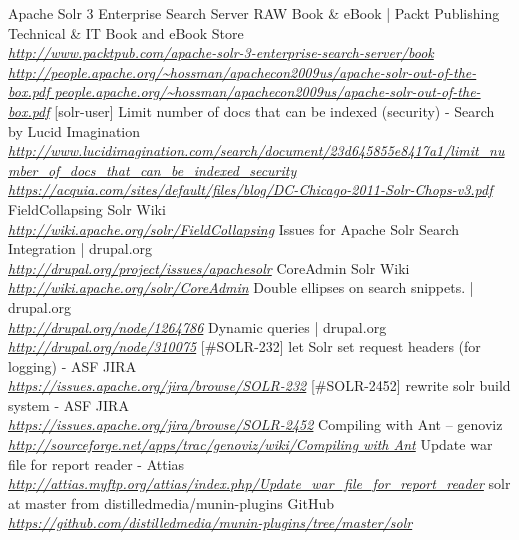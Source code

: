 \begin{thebibliography}{99}
		Apache Solr 3 Enterprise Search Server RAW Book \& eBook | Packt Publishing Technical \& IT Book and eBook Store\\
		\emph{\url{http://www.packtpub.com/apache-solr-3-enterprise-search-server/book}}
		\emph{\url{http://people.apache.org/~hossman/apachecon2009us/apache-solr-out-of-the-box.pdf people.apache.org/~hossman/apachecon2009us/apache-solr-out-of-the-box.pdf}}
		[solr-user] Limit number of docs that can be indexed (security) - Search by Lucid Imagination\\
		\emph{\url{http://www.lucidimagination.com/search/document/23d645855e8417a1/limit_number_of_docs_that_can_be_indexed_security}}
		\emph{\url{https://acquia.com/sites/default/files/blog/DC-Chicago-2011-Solr-Chops-v3.pdf}}
	 	FieldCollapsing \- Solr Wiki\\
		\emph{\url{http://wiki.apache.org/solr/FieldCollapsing}}
		Issues for Apache Solr Search Integration | drupal.org\\
		\emph{\url{http://drupal.org/project/issues/apachesolr}}
		CoreAdmin \- Solr Wiki\\
		\emph{\url{http://wiki.apache.org/solr/CoreAdmin}}
		Double ellipses on search snippets. | drupal.org\\
		\emph{\url{http://drupal.org/node/1264786}}
		Dynamic queries | drupal.org\\
		\emph{\url{http://drupal.org/node/310075}}
		[\#SOLR-232] let Solr set request headers (for logging) - ASF JIRA\\
		\emph{\url{https://issues.apache.org/jira/browse/SOLR-232}}
	 	[\#SOLR-2452] rewrite solr build system - ASF JIRA\\
		\emph{\url{https://issues.apache.org/jira/browse/SOLR-2452}}
		Compiling with Ant – genoviz\\
		\emph{\url{http://sourceforge.net/apps/trac/genoviz/wiki/Compiling with Ant}}
		Update war file for report reader - Attias\\
		\emph{\url{http://attias.myftp.org/attias/index.php/Update_war_file_for_report_reader}}
		solr at master from distilledmedia/munin-plugins \- GitHub\\
		\emph{\url{https://github.com/distilledmedia/munin-plugins/tree/master/solr}}

\end{thebibliography}
